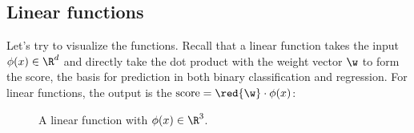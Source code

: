 \subsection{Linear functions}
Let's try to visualize the functions.
%
Recall that a linear function takes the input $\phi(x) \in \R^d$ and directly take the dot product with the weight vector $\w$ to form the score,
%
the basis for prediction in both binary classification and regression.
% 
For linear functions, the output is the $\text{score} = \red{\w} \cdot \phi(x)$:
\begin{figure}
\begin{center}
\end{center}
\caption{
	\label{fig:linear}
	A linear function with $\phi(x) \in \R^3$.
}
\end{figure}


